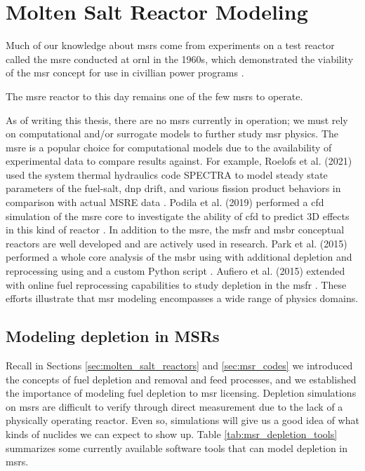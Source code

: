 \chapter{Molten Salt Reactor Modeling}%
\label{ch:chapter2}
Much of our knowledge about \Gls{msr}s come from experiments on a test reactor
called the \Gls{msre} conducted at \Gls{ornl} in the 1960s, which demonstrated
the viability of the \Gls{msr} concept for use in civillian power programs
\cite{haubenreich_experience_1970} \cite{rosenthal_history_1970}.

The \Gls{msre} reactor to this day remains one of the few \Gls{msr}s to operate.

As of writing this thesis, there are no \Gls{msr}s currently in operation; we
must rely on computational and/or surrogate models to further study \Gls{msr}
physics. The \Gls{msre} is a popular choice for computational models due to the
availability of experimental data to compare results against. For example,
Roelofs et al. (2021) used the system thermal hydraulics code SPECTRA to model
steady state parameters of the fuel-salt, \Gls{dnp} drift, and various fission
product behaviors in comparison with actual MSRE data \cite{roelofs_molten_2021}.
Podila et al. (2019) performed a \Gls{cfd} simulation of the \Gls{msre} core to
investigate the ability of \Gls{cfd} to predict 3D effects in this kind of
reactor \cite{podila_cfd_2019}. 
In addition to the \Gls{msre}, the \Gls{msfr} \cite{merle-lucotte_launching_2011}
and \Gls{msbr} \cite{robertson_conceptual_1971} conceptual reactors are well
developed and are actively used in research. Park et al. (2015) performed a
whole core analysis of the \Gls{msbr} using \MCNPSIX with additional depletion
and reprocessing using \CINDERNINETY and a custom Python script \cite{park_whole_2015}. Aufiero et al. (2015) extended \SerpentTWO with online
fuel reprocessing capabilities to study depletion in the \Gls{msfr}
\cite{aufiero_extended_2013}. These efforts illustrate that \Gls{msr} modeling
encompasses a wide range of physics domains.

\section{Modeling depletion in MSRs} Recall in Sections
\ref{sec:molten_salt_reactors} and \ref{sec:msr_codes} we introduced the
concepts of fuel depletion and removal and feed processes, and we established
the importance of modeling fuel depletion to \Gls{msr} licensing. Depletion
simulations on \Gls{msr}s are difficult to verify through direct
measurement due to the lack of a physically operating reactor. Even so,
simulations will give us a good idea of what kinds of nuclides we can expect to
show up. Table \ref{tab:msr_depletion_tools} summarizes some currently available
software tools that can model depletion in \Gls{msr}s. 

